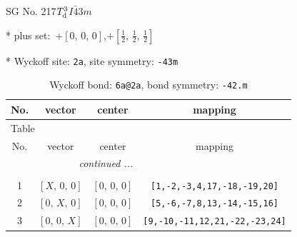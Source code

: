 \documentclass[fleqn,8pt]{jsarticle}
\begin{document}
\setcounter{MaxMatrixCols}{32}

\renewcommand{\tablename}{Table~}
\renewcommand{\figurename}{Figure~}
\begin{center}
\LARGE
SG No. 217\quad$T_{\rm d}^{3}$\quad$I\bar{4}3m$\quad[ cubic ]
\end{center}

* plus set:\,\,\,$+\left[ 0,\, 0,\, 0 \right]$,\quad $+\left[ \frac{1}{2},\, \frac{1}{2},\, \frac{1}{2} \right]$


* Wyckoff site: {\tt 2a}, site symmetry: {\tt -43m}
\renewcommand{\arraystretch}{1.2}
\begin{longtable}{cccc}
\caption{Wyckoff bond: {\tt 6a@2a}, bond symmetry: {\tt -42.m}}
 \\
 \hline \hline
No. & vector & center & mapping \\ \hline \endfirsthead

\multicolumn{3}{l}{\tablename\ \thetable{}} \\
 \hline \hline
No. & vector & center & mapping \\ \hline \endhead

 \hline \hline
\multicolumn{3}{r}{\footnotesize\it continued ...} \\ \endfoot

 \hline \hline
\multicolumn{3}{r}{} \\ \endlastfoot

1 & $\left[ X,\, 0,\, 0 \right]$ & $\left[ 0,\, 0,\, 0 \right]$ & {\tt [1,-2,-3,4,17,-18,-19,20]} \\ \hline
2 & $\left[ 0,\, X,\, 0 \right]$ & $\left[ 0,\, 0,\, 0 \right]$ & {\tt [5,-6,-7,8,13,-14,-15,16]} \\ \hline
3 & $\left[ 0,\, 0,\, X \right]$ & $\left[ 0,\, 0,\, 0 \right]$ & {\tt [9,-10,-11,12,21,-22,-23,24]} \\
\end{longtable}
\renewcommand{\arraystretch}{1.2}
\end{document}
